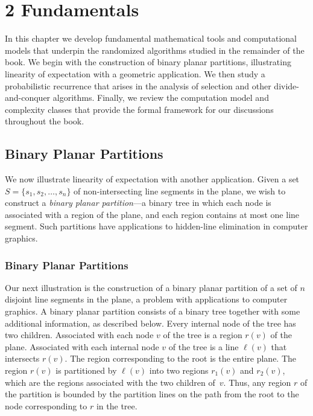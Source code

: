 \documentclass[twoside,12pt]{book}
\theoremstyle{plain}
\theoremstyle{definition}
\theoremstyle{remark}
\begin{document}
\chapter*{2 Fundamentals}
\label{ch:fundamentals}

In this chapter we develop fundamental mathematical tools and computational
models that underpin the randomized algorithms studied in the remainder of
the book. We begin with the construction of binary planar partitions,
illustrating linearity of expectation with a geometric application. We then
study a probabilistic recurrence that arises in the analysis of selection
and other divide-and-conquer algorithms. Finally, we review the computation
model and complexity classes that provide the formal framework for our
discussions throughout the book.

\section{Binary Planar Partitions}
\label{sec:bpp}

We now illustrate linearity of expectation with another application. Given a
set $S=\{s_1,s_2,\ldots,s_n\}$ of non-intersecting line segments in the
plane, we wish to construct a \emph{binary planar partition}---a binary
tree in which each node is associated with a region of the plane, and each
region contains at most one line segment. Such partitions have applications
to hidden-line elimination in computer graphics.

\subsection{Binary Planar Partitions}

Our next illustration is the construction of a binary planar partition of a
set of $n$ disjoint line segments in the plane, a problem with applications
to computer graphics.  A binary planar partition consists of a binary tree
together with some additional information, as described below.  Every internal
node of the tree has two children.  Associated with each node $v$ of the tree
is a region $r(v)$ of the plane.  Associated with each internal node $v$ of
the tree is a line $\ell(v)$ that intersects $r(v)$.  The region
corresponding to the root is the entire plane.  The region $r(v)$ is
partitioned by $\ell(v)$ into two regions $r_1(v)$ and $r_2(v)$, which are
the regions associated with the two children of~$v$.  Thus, any region $r$ of
the partition is bounded by the partition lines on the path from the root to
the node corresponding to $r$ in the tree.
\end{document}
